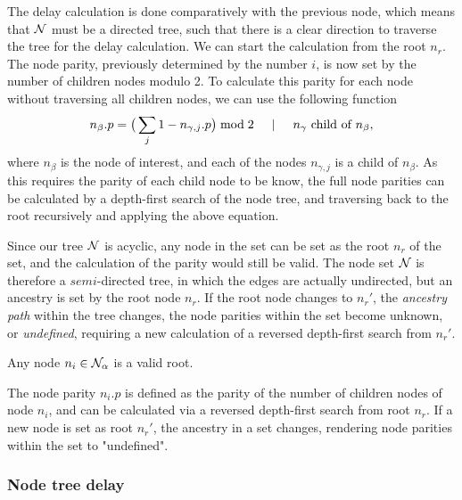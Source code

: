 The delay calculation is done comparatively with the previous node, which means that $\mathcal{N}$ must be a directed tree, such that there is a clear direction to traverse the tree for the delay calculation. We can start the calculation from the root $n_r$. The node parity, previously determined by the number $i$, is now set by the number of children nodes modulo 2. To calculate this parity for each node without traversing all children nodes, we can use the following function
\begin{equation*}
  n_\beta.p = \big( \sum_{j} 1-n_{\gamma,j}.p \big ) \bmod 2 \hspace{.5cm} | \hspace{.5cm} n_\gamma \mbox{ child of } n_\beta ,
\end{equation*}
where $n_\beta$ is the node of interest, and each of the nodes $n_{\gamma,j}$ is a child of $n_\beta$. As this requires the parity of each child node to be know, the full node parities can be calculated by a depth-first search of the node tree, and traversing back to the root recursively and applying the above equation. 

Since our tree $\mathcal{N}$ is acyclic, any node in the set can be set as the root $n_r$ of the set, and the calculation of the parity would still be valid. The node set $\mathcal{N}$ is therefore a $semi$-directed tree, in which the edges are actually undirected, but an ancestry is set by the root node $n_r$. If the root node changes to $n_{r}'$, the \emph{ancestry path} within the tree changes, the node parities within the set become unknown, or \emph{undefined}, requiring a new calculation of a reversed depth-first search from $n_{r}'$.

\begin{lemma}
  Any node $n_i \in \mathcal{N}_\alpha$ is a valid root.
\end{lemma}

\begin{lemma}\label{lem:nodecalc_parity}
  The node parity $n_i.p$ is defined as the parity of the number of children nodes of node $n_i$, and can be calculated via a reversed depth-first search from root $n_r$. If a new node is set as root $n_r'$, the ancestry in a set changes, rendering node parities within the set to "undefined". 
\end{lemma}

\subsubsection{Node tree delay}

